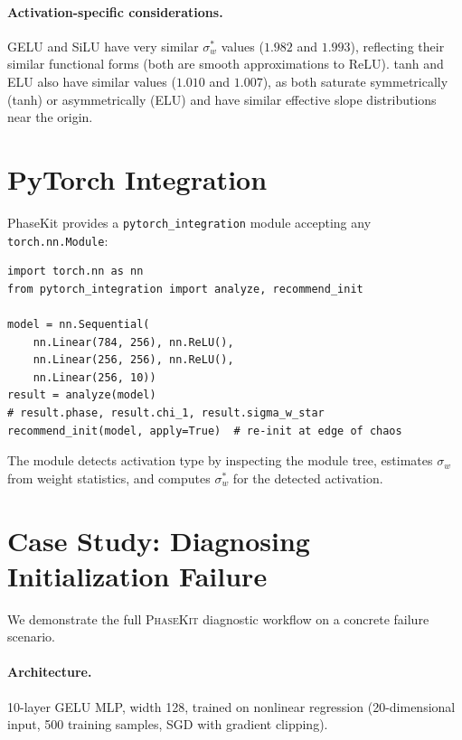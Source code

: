 \documentclass[10pt]{article}
\newcommand{\ToolName}{\textsc{PhaseKit}}
\begin{document}
\paragraph{Activation-specific considerations.}
GELU and SiLU have very similar $\sigma_w^*$ values ($1.982$ and $1.993$), reflecting their similar functional forms (both are smooth approximations to ReLU).
tanh and ELU also have similar values ($1.010$ and $1.007$), as both saturate symmetrically (tanh) or asymmetrically (ELU) and have similar effective slope distributions near the origin.

\section{PyTorch Integration}
\label{app:pytorch}

PhaseKit provides a \texttt{pytorch\_integration} module accepting any \texttt{torch.nn.Module}:

\begin{verbatim}
import torch.nn as nn
from pytorch_integration import analyze, recommend_init

model = nn.Sequential(
    nn.Linear(784, 256), nn.ReLU(),
    nn.Linear(256, 256), nn.ReLU(),
    nn.Linear(256, 10))
result = analyze(model)
# result.phase, result.chi_1, result.sigma_w_star
recommend_init(model, apply=True)  # re-init at edge of chaos
\end{verbatim}

The module detects activation type by inspecting the module tree, estimates $\sigma_w$ from weight statistics, and computes $\sigma_w^*$ for the detected activation.

\section{Case Study: Diagnosing Initialization Failure}
\label{app:case-study}

We demonstrate the full \ToolName{} diagnostic workflow on a concrete failure scenario.

\paragraph{Architecture.} 10-layer GELU MLP, width 128, trained on nonlinear regression (20-dimensional input, 500 training samples, SGD with gradient clipping).
\end{document}
